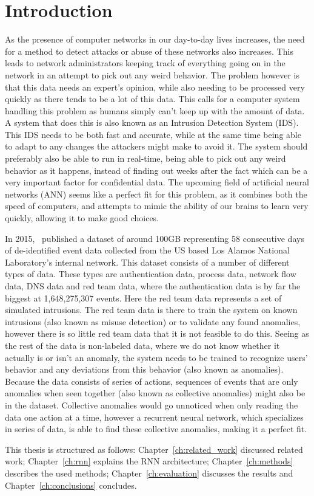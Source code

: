 \chapter{Introduction}\label{ch:introduction}
As the presence of computer networks in our day-to-day lives increases, the need for a method to detect attacks or abuse of these networks also increases. This leads to network administrators keeping track of everything going on in the network in an attempt to pick out any weird behavior. The problem however is that this data needs an expert's opinion, while also needing to be processed very quickly as there tends to be a lot of this data. This calls for a computer system handling this problem as humans simply can't keep up with the amount of data. A system that does this is also known as an Intrusion Detection System (IDS). This IDS needs to be both fast and accurate, while at the same time being able to adapt to any changes the attackers might make to avoid it. The system should preferably also be able to run in real-time, being able to pick out any weird behavior as it happens, instead of finding out weeks after the fact which can be a very important factor for confidential data. The upcoming field of artificial neural networks (ANN) seems like a perfect fit for this problem, as it combines both the speed of computers, and attempts to mimic the ability of our brains to learn very quickly, allowing it to make good choices.

In 2015,~\cite{akent-2015-enterprise-data} published a dataset of around 100GB representing 58 consecutive days of de-identified event data collected from the US based Los Alamos National Laboratory's internal network. This dataset consists of a number of different types of data. These types are authentication data, process data, network flow data, DNS data and red team data, where the authentication data is by far the biggest at 1,648,275,307 events. Here the red team data represents a set of simulated intrusions. The red team data is there to train the system on known intrusions (also known as misuse detection) or to validate any found anomalies, however there is so little red team data that it is not feasible to do this. Seeing as the rest of the data is non-labeled data, where we do not know whether it actually is or isn't an anomaly, the system needs to be trained to recognize users' behavior and any deviations from this behavior (also known as anomalies). Because the data consists of series of actions, sequences of events that are only anomalies when seen together (also known as collective anomalies) might also be in the dataset. Collective anomalies would go unnoticed when only reading the data one action at a time, however a recurrent neural network, which specializes in series of data, is able to find these collective anomalies, making it a perfect fit.

This thesis is structured as follows: Chapter~\ref{ch:related_work} discussed related work; Chapter~\ref{ch:rnn} explains the RNN architecture; Chapter~\ref{ch:methods} describes the used methods; Chapter~\ref{ch:evaluation} discusses the results and Chapter~\ref{ch:conclusions} concludes.